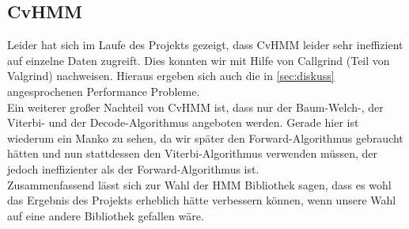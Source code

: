 

\subsection{CvHMM}
\label{sec:CvHMM}
Leider hat sich im Laufe des Projekts gezeigt, dass CvHMM leider sehr ineffizient auf einzelne Daten zugreift. Dies konnten wir mit Hilfe von Callgrind (Teil von Valgrind) nachweisen.
Hieraus ergeben sich auch die in \ref{sec:diskuss} angesprochenen Performance Probleme.\\ 
Ein weiterer großer Nachteil von CvHMM ist, dass nur der Baum-Welch-, der Viterbi- und der Decode-Algorithmus angeboten werden.
 Gerade hier ist wiederum ein Manko zu sehen, da wir später den Forward-Algorithmus gebraucht hätten und nun stattdessen den Viterbi-Algorithmus verwenden müssen, der jedoch ineffizienter als der Forward-Algorithmus ist.\\
Zusammenfassend lässt sich zur Wahl der HMM Bibliothek sagen, dass es wohl das Ergebnis des Projekts erheblich hätte verbessern können, wenn unsere Wahl auf eine andere Bibliothek gefallen wäre.\\
